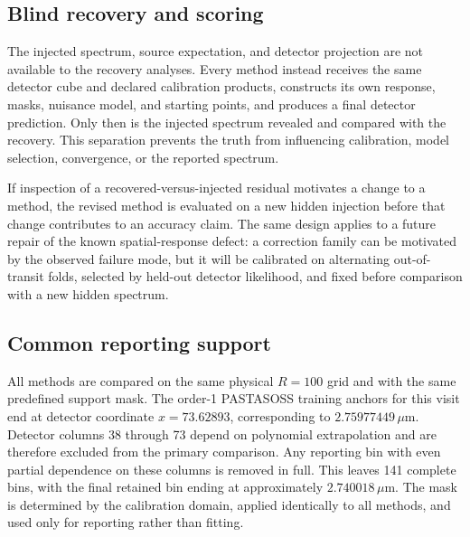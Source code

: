 \subsection{Blind recovery and scoring}

The injected spectrum, source expectation, and detector projection are not
available to the recovery analyses. Every method instead receives the same
detector cube and declared calibration products, constructs its own response,
masks, nuisance model, and starting points, and produces a final detector
prediction. Only then is the injected spectrum revealed and compared with the
recovery. This separation prevents the truth from influencing calibration,
model selection, convergence, or the reported spectrum.

If inspection of a recovered-versus-injected residual motivates a change to a
method, the revised method is evaluated on a new hidden injection before that
change contributes to an accuracy claim. The same design applies to a future
repair of the known spatial-response defect: a correction family can be
motivated by the observed failure mode, but it will be calibrated on
alternating out-of-transit folds, selected by held-out detector likelihood,
and fixed before comparison with a new hidden spectrum.

\subsection{Common reporting support}

All methods are compared on the same physical $R=100$ grid and with the same
predefined support mask. The order-1 PASTASOSS training anchors for this visit
end at detector coordinate $x=73.62893$, corresponding to
$2.75977449\,\mu\mathrm{m}$. Detector columns 38 through 73 depend on
polynomial extrapolation and are therefore excluded from the primary
comparison. Any reporting bin with even partial dependence on these columns is
removed in full. This leaves 141 complete bins, with the final retained bin
ending at approximately $2.740018\,\mu\mathrm{m}$. The mask is determined by
the calibration domain, applied identically to all methods, and used only for
reporting rather than fitting.

